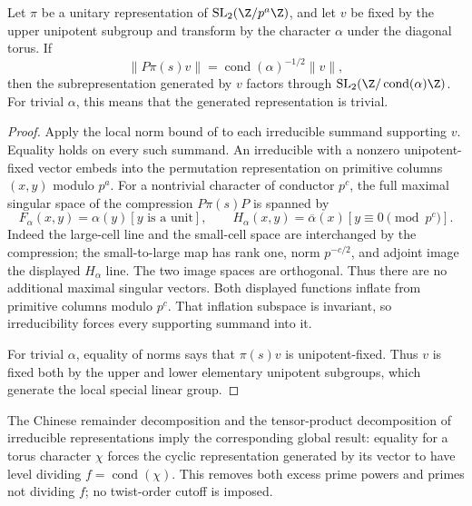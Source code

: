 \begin{lemma}
\label{lem:creative-local-conductor}
Let $\pi$ be a unitary representation of
$\mathrm{SL}_2(\Z/p^a\Z)$, and let $v$ be fixed by the upper
unipotent subgroup and transform by the character $\alpha$ under the
diagonal torus. If
\[
 \|P\pi(s)v\|=\operatorname{cond}(\alpha)^{-1/2}\|v\|,
\]
then the subrepresentation generated by $v$ factors through
$\mathrm{SL}_2(\Z/\operatorname{cond}(\alpha)\Z)$.
For trivial $\alpha$, this means that the generated representation is
trivial.
\end{lemma}
\begin{proof}
Apply the local norm bound of
\cite[Lemma~4.1]{SchopierayDimensionBlock} to each irreducible
summand supporting $v$. Equality holds on every such summand.
An irreducible with a nonzero unipotent-fixed vector embeds into the
permutation representation on primitive columns $(x,y)$ modulo $p^a$.
For a nontrivial character of conductor $p^c$, the full maximal
singular space of the compression $P\pi(s)P$ is spanned by
\[
 F_\alpha(x,y)=\alpha(y)[y\text{ is a unit}],\qquad
 H_\alpha(x,y)=\overline{\alpha}(x)[y\equiv0\pmod{p^c}].
\]
Indeed the large-cell line and the small-cell space are interchanged
by the compression; the small-to-large map has rank one, norm
$p^{-c/2}$, and adjoint image the displayed $H_\alpha$ line.
The two image spaces are orthogonal. Thus there are no additional
maximal singular vectors. Both displayed functions inflate from
primitive columns modulo $p^c$. That inflation subspace is invariant,
so irreducibility forces every supporting summand into it.

For trivial $\alpha$, equality of norms says that $\pi(s)v$ is
unipotent-fixed. Thus $v$ is fixed both by the upper and lower
elementary unipotent subgroups, which generate the local special
linear group.
\end{proof}

The Chinese remainder decomposition and the tensor-product
decomposition of irreducible representations imply the corresponding
global result: equality for a torus character $\chi$ forces the cyclic
representation generated by its vector to have level dividing
$f=\operatorname{cond}(\chi)$. This removes both excess prime powers
and primes not dividing $f$; no twist-order cutoff is imposed.

